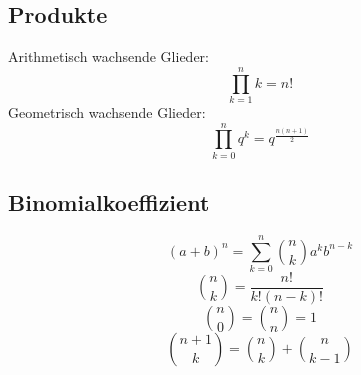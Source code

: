 \documentclass[a4paper,twocolumn,10pt]{article}
\begin{document}
\subsection{Produkte}
Arithmetisch wachsende Glieder:\\
\begin{equation*}
\prod\limits_{k=1}^{n}k=n!
\end{equation*}
Geometrisch wachsende Glieder:\\
\begin{equation*}
\prod\limits_{k=0}^{n}q^k=q^{\frac{n(n+1)}{2}}
\end{equation*}

\subsection{Binomialkoeffizient}
\begin{equation*}
(a+b)^n=\sum\limits_{k=0}^{n}\binom{n}{k}a^kb^{n-k}
\end{equation*}
\begin{equation*}
\binom{n}{k}=\frac{n!}{k!(n-k)!}
\end{equation*}
\begin{equation*}
\binom{n}{0}=\binom{n}{n}=1
\end{equation*}
\begin{equation*}
\binom{n+1}{k}=\binom{n}{k}+\binom{n}{k-1}
\end{equation*}
\end{document}
